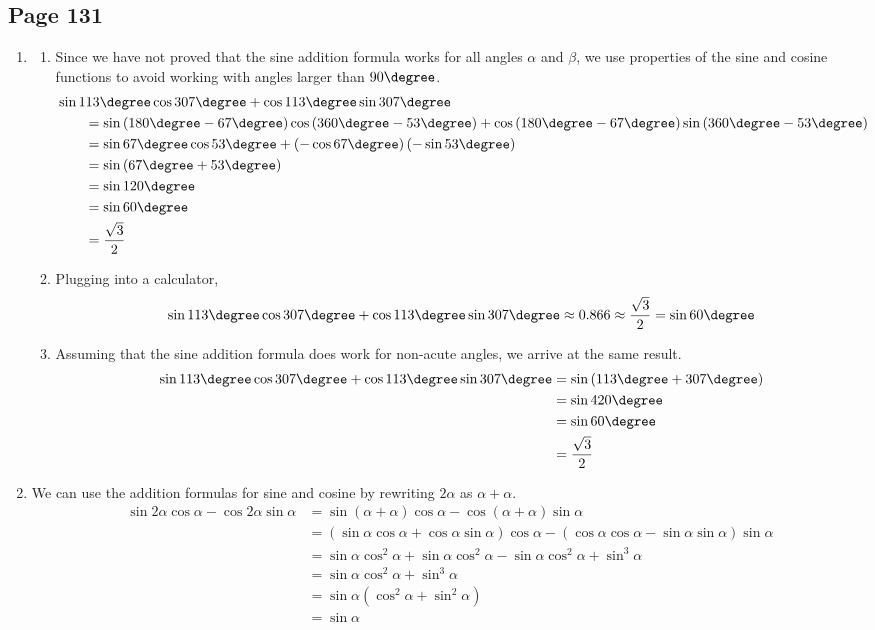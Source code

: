 \documentclass{article}
\newenvironment{solutions}[1]
{\subsection*{#1}
 \begin{enumerate}[leftmargin=1.5em]}
{\end{enumerate}}
\newcommand{\solution}{\item}
\newenvironment{subsolutions}
{\begin{enumerate}}
{\end{enumerate}}
\newcommand{\subsolution}{\item}
\begin{document}
\begin{solutions}{Page 131}
\solution %
\begin{subsolutions}
\subsolution %
Since we have not proved that the sine addition formula works for all angles $\alpha$ and $\beta$, we use properties of the sine and cosine functions to avoid working with angles larger than $90\degree$.
\begin{align*}
&\sin{113\degree}\cos{307\degree} + \cos{113\degree}\sin{307\degree} \\
&\qquad = \sin\left(180\degree-67\degree\right)\cos\left(360\degree-53\degree\right) + \cos\left(180\degree-67\degree\right)\sin\left(360\degree-53\degree\right) \\
&\qquad = \sin{67\degree}\cos{53\degree} + \left(-\cos{67\degree}\right)\left(-\sin{53\degree}\right) \\
&\qquad = \sin\left(67\degree + 53\degree\right) \\
&\qquad = \sin{120\degree} \\
&\qquad = \sin{60\degree} \\
&\qquad = \dfrac{\sqrt{3}}{2}
\end{align*}

\subsolution %
Plugging into a calculator,
\[
\sin{113\degree}\cos{307\degree} + \cos{113\degree}\sin{307\degree} \approx 0.866 \approx \dfrac{\sqrt{3}}{2} = \sin{60\degree}
\]
\subsolution %
Assuming that the sine addition formula does work for non-acute angles, we arrive at the same result.
\begin{align*}
\sin{113\degree}\cos{307\degree} + \cos{113\degree}\sin{307\degree} &= \sin\left(113\degree + 307\degree\right) \\
&= \sin{420\degree} \\
&= \sin{60\degree} \\
&= \dfrac{\sqrt{3}}{2}
\end{align*}

\end{subsolutions}

\solution %
We can use the addition formulas for sine and cosine by rewriting $2\alpha$ as $\alpha + \alpha$.
\begin{align*}
\sin{2\alpha}\cos{\alpha} - \cos{2\alpha}\sin{\alpha} &= \sin\left(\alpha + \alpha\right)\cos{\alpha} - \cos\left(\alpha + \alpha\right)\sin{\alpha} \\ 
&= \left(\sin{\alpha}\cos{\alpha} + \cos{\alpha}\sin{\alpha}\right)\cos{\alpha} - \left(\cos{\alpha}\cos{\alpha}-\sin{\alpha}\sin{\alpha}\right)\sin{\alpha} \\
&= \sin{\alpha}\cos^{2}{\alpha} + \sin{\alpha}\cos^{2}{\alpha} - \sin{\alpha}\cos^{2}{\alpha} + \sin^{3}{\alpha} \\
&=\sin{\alpha}\cos^{2}{\alpha} + \sin^{3}{\alpha} \\
&= \sin{\alpha}\left(\cos^{2}\alpha+\sin^{2}\alpha\right) \\
&= \sin{\alpha}
\end{align*}


\end{solutions}
\end{document}

